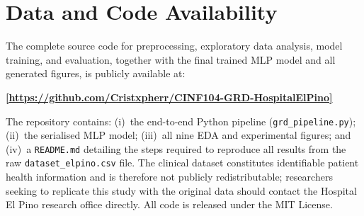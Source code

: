 \documentclass[journal]{IEEEtran}
\begin{document}
\section{Data and Code Availability}
\label{sec:availability}

The complete source code for preprocessing, exploratory data
analysis, model training, and evaluation, together with the
final trained MLP model and all generated figures, is publicly
available at:
\begin{center}
  \textbf{\url{[https://github.com/Cristxpherr/CINF104-GRD-HospitalElPino]}}
\end{center}
The repository contains: (i)~the end-to-end Python pipeline
(\texttt{grd\_pipeline.py}); (ii)~the serialised MLP model;
(iii)~all nine EDA and experimental figures; and (iv)~a
\texttt{README.md} detailing the steps required to reproduce
all results from the raw \texttt{dataset\_elpino.csv} file.
The clinical dataset constitutes identifiable patient health
information and is therefore not publicly redistributable;
researchers seeking to replicate this study with the original
data should contact the Hospital El Pino research office
directly.  All code is released under the MIT License.

\balance


\end{document}
